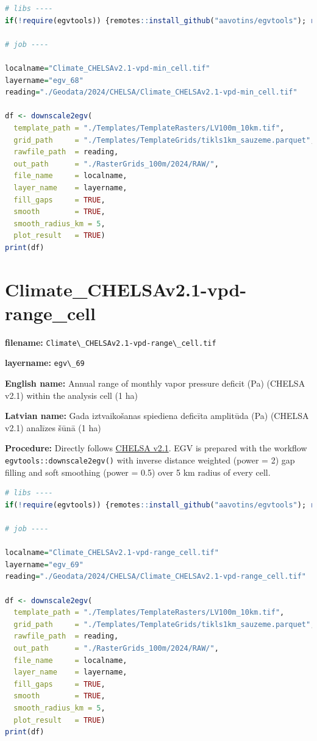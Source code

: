 \documentclass[
]{book}
\newcommand{\passthrough}[1]{#1}
\begin{document}
\begin{lstlisting}[language=R]
# libs ----
if(!require(egvtools)) {remotes::install_github("aavotins/egvtools"); require(egvtools)}

# job ----

localname="Climate_CHELSAv2.1-vpd-min_cell.tif"
layername="egv_68"
reading="./Geodata/2024/CHELSA/Climate_CHELSAv2.1-vpd-min_cell.tif"

df <- downscale2egv(
  template_path = "./Templates/TemplateRasters/LV100m_10km.tif",
  grid_path     = "./Templates/TemplateGrids/tikls1km_sauzeme.parquet",
  rawfile_path  = reading,
  out_path      = "./RasterGrids_100m/2024/RAW/",
  file_name     = localname,
  layer_name    = layername,
  fill_gaps     = TRUE,
  smooth        = TRUE,
  smooth_radius_km = 5,
  plot_result   = TRUE)
print(df)
\end{lstlisting}

\section{Climate\_CHELSAv2.1-vpd-range\_cell}\label{ch06.069}

\textbf{filename:} \passthrough{\lstinline!Climate\_CHELSAv2.1-vpd-range\_cell.tif!}

\textbf{layername:} \passthrough{\lstinline!egv\_69!}

\textbf{English name:} Annual range of monthly vapor pressure deficit (Pa) (CHELSA v2.1) within the analysis cell (1 ha)

\textbf{Latvian name:} Gada iztvaikošanas spiediena deficīta amplitūda (Pa) (CHELSA v2.1) analīzes šūnā (1 ha)

\textbf{Procedure:} Directly follows \hyperref[Ch04.11]{CHELSA v2.1}. EGV is prepared with the
workflow \passthrough{\lstinline!egvtools::downscale2egv()!} with inverse distance weighted (power = 2)
gap filling and soft smoothing (power = 0.5) over 5 km radius of every cell.

\begin{lstlisting}[language=R]
# libs ----
if(!require(egvtools)) {remotes::install_github("aavotins/egvtools"); require(egvtools)}

# job ----

localname="Climate_CHELSAv2.1-vpd-range_cell.tif"
layername="egv_69"
reading="./Geodata/2024/CHELSA/Climate_CHELSAv2.1-vpd-range_cell.tif"

df <- downscale2egv(
  template_path = "./Templates/TemplateRasters/LV100m_10km.tif",
  grid_path     = "./Templates/TemplateGrids/tikls1km_sauzeme.parquet",
  rawfile_path  = reading,
  out_path      = "./RasterGrids_100m/2024/RAW/",
  file_name     = localname,
  layer_name    = layername,
  fill_gaps     = TRUE,
  smooth        = TRUE,
  smooth_radius_km = 5,
  plot_result   = TRUE)
print(df)
\end{lstlisting}
\end{document}
